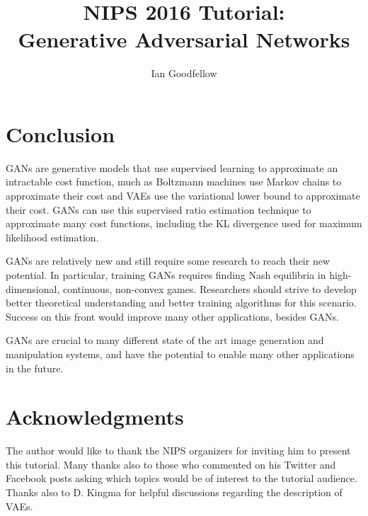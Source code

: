 \documentclass[]{article}
\title{NIPS 2016 Tutorial:\\ Generative Adversarial Networks}
\author{Ian Goodfellow}
\affil{OpenAI, {\tt ian@openai.com}}
\date{}
\DeclareRobustCommand{\[}{\begin{equation}}
\DeclareRobustCommand{\]}{\end{equation}}
\begin{document}
\newlength{\figwidth}
\setlength{\figwidth}{26pc}

\maketitle












\section{Conclusion}

GANs are generative models that use supervised learning to approximate an intractable cost
function, much as Boltzmann machines use Markov chains to approximate their cost and VAEs
use the variational lower bound to approximate their cost.
GANs can use this supervised ratio estimation technique to approximate many cost functions, including the KL divergence used for maximum
likelihood estimation.

GANs are relatively new and still require some research to reach their new potential.
In particular, training GANs requires finding Nash equilibria in high-dimensional,
continuous, non-convex games.
Researchers should strive to develop better theoretical understanding and better training
algorithms for this scenario.
Success on this front would improve many other applications, besides GANs.

GANs are crucial to many different state of the art image generation and manipulation systems,
and have the potential to enable many other applications in the future.

\section*{Acknowledgments}
The author would like to thank the NIPS organizers for inviting him to
present this tutorial.
Many thanks also to those who commented on his Twitter and Facebook posts
asking which topics would be of interest to the tutorial audience.
Thanks also to D. Kingma for helpful discussions regarding the description of VAEs.



\end{document}
